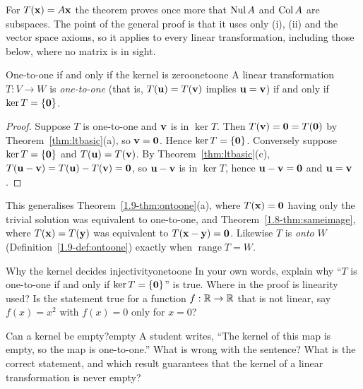 \documentclass[11pt]{article}
\begin{document}
For $T(\mathbf{x})=A\mathbf{x}$ the theorem proves once more that $\operatorname{Nul} A$ and $\operatorname{Col} A$ are subspaces. The point of the general proof is that it uses only (i), (ii) and the vector space axioms, so it applies to every linear transformation, including those below, where no matrix is in sight.

\begin{thm}{One-to-one if and only if the kernel is zero}{onetoone}
A linear transformation $T:V\to W$ is \emph{one-to-one} (that is, $T(\mathbf{u})=T(\mathbf{v})$ implies $\mathbf{u}=\mathbf{v}$) if and only if $\ker T=\{\mathbf{0}\}$.
\end{thm}

\begin{proof}
Suppose $T$ is one-to-one and $\mathbf{v}$ is in $\ker T$. Then $T(\mathbf{v})=\mathbf{0}=T(\mathbf{0})$ by Theorem~\ref{thm:ltbasic}(a), so $\mathbf{v}=\mathbf{0}$. Hence $\ker T=\{\mathbf{0}\}$. Conversely suppose $\ker T=\{\mathbf{0}\}$ and $T(\mathbf{u})=T(\mathbf{v})$. By Theorem~\ref{thm:ltbasic}(c), $T(\mathbf{u}-\mathbf{v})=T(\mathbf{u})-T(\mathbf{v})=\mathbf{0}$, so $\mathbf{u}-\mathbf{v}$ is in $\ker T$, hence $\mathbf{u}-\mathbf{v}=\mathbf{0}$ and $\mathbf{u}=\mathbf{v}$.
\end{proof}

This generalises Theorem~\ref{1.9-thm:ontoone}(a), where $T(\mathbf{x})=\mathbf{0}$ having only the trivial solution was equivalent to one-to-one, and Theorem~\ref{1.8-thm:sameimage}, where $T(\mathbf{x})=T(\mathbf{y})$ was equivalent to $T(\mathbf{x}-\mathbf{y})=\mathbf{0}$. Likewise $T$ is \emph{onto} $W$ (Definition~\ref{1.9-def:ontoone}) exactly when $\operatorname{range}T=W$.

\begin{think}{Why the kernel decides injectivity}{onetoone}
In your own words, explain why ``$T$ is one-to-one if and only if $\ker T=\{\mathbf{0}\}$'' is true. Where in the proof is linearity used? Is the statement true for a function $f:\mathbb{R}\to\mathbb{R}$ that is not linear, say $f(x)=x^2$ with $f(x)=0$ only for $x=0$?
\end{think}

\begin{think}{Can a kernel be empty?}{empty}
A student writes, ``The kernel of this map is empty, so the map is one-to-one.'' What is wrong with the sentence? What is the correct statement, and which result guarantees that the kernel of a linear transformation is never empty?
\end{think}
\end{document}
